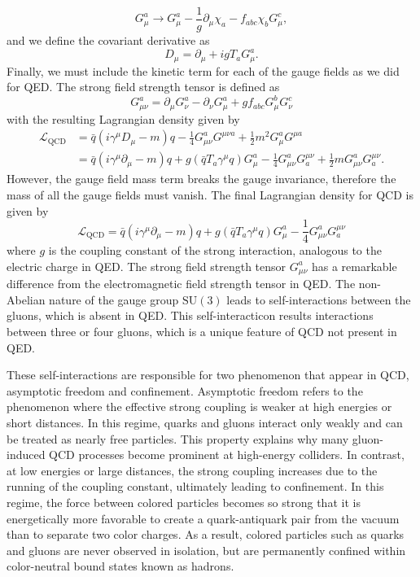 \begin{equation}
  G_{\mu}^{a} \to G_{\mu}^{a} - \frac{1}{g} \partial_{\mu}\chi_{a} - f_{abc}\chi_{b}G_{\mu}^{c},
\end{equation}
and we define the covariant derivative as
\begin{equation}
  D_{\mu} = \partial_{\mu} + ig T_{a}G_{\mu}^{a}.
  \label{eq:qcd_covariant_derivative}
\end{equation}
Finally, we must include the kinetic term for each of the gauge fields as we did for QED\@. The strong field strength tensor is defined as
\begin{equation}
  G_{\mu\nu}^{a} = \partial_{\mu}G_{\nu}^{a} - \partial_{\nu}G_{\mu}^{a} + g f_{abc}G_{\mu}^{b}G_{\nu}^{c}
  \label{eq:qcd_field_strength_tensor}
\end{equation}
with the resulting Lagrangian density given by
\begin{align}
  \mathcal{L}_{\mathrm{QCD}} &= \bar{q}(i\gamma^{\mu}D_{\mu} - m)q - \frac{1}{4}G_{\mu\nu}^{a}G^{\mu\nu a} + \frac{1}{2}m^2G_{\mu}^{a}G^{\mu a} \nonumber \nonumber \\
  &= \bar{q}(i\gamma^{\mu}\partial_{\mu} - m)q + g(\bar{q}T_{a}\gamma^{\mu}q)G_{\mu}^{a} - \frac{1}{4}G_{\mu\nu}^{a}G_{a}^{\mu\nu} + \frac{1}{2}mG_{\mu\nu}^{a}G_{a}^{\mu\nu}.
  \label{eq:qcd_lagrangian}
\end{align}
However, the gauge field mass term breaks the gauge invariance, therefore the mass of all the gauge fields must vanish. The final Lagrangian density for QCD is given by
\begin{equation}
  \mathcal{L}_{\mathrm{QCD}} = \bar{q}(i\gamma^{\mu}\partial_{\mu} - m)q + g(\bar{q}T_{a}\gamma^{\mu}q)G_{\mu}^{a} - \frac{1}{4}G_{\mu\nu}^{a}G_{a}^{\mu\nu}
  \label{eq:qcd_lagrangian_final}
\end{equation}
where $g$ is the coupling constant of the strong interaction, analogous to the electric charge in QED\@. The strong field strength tensor $G_{\mu\nu}^{a}$ has a remarkable difference from the electromagnetic field strength tensor in QED\@. The non-Abelian nature of the gauge group $\mathrm{SU}(3)$ leads to self-interactions between the gluons, which is absent in QED\@. This self-interacticon results interactions between three or four gluons, which is a unique feature of QCD not present in QED\@.

These self-interactions are responsible for two phenomenon that appear in QCD, asymptotic freedom and confinement. Asymptotic freedom refers to the phenomenon where the effective strong coupling is weaker at high energies or short distances. In this regime, quarks and gluons interact only weakly and can be treated as nearly free particles. This property explains why many gluon-induced QCD processes become prominent at high-energy colliders. In contrast, at low energies or large distances, the strong coupling increases due to the running of the coupling constant, ultimately leading to confinement. In this regime, the force between colored particles becomes so strong that it is energetically more favorable to create a quark-antiquark pair from the vacuum than to separate two color charges. As a result, colored particles such as quarks and gluons are never observed in isolation, but are permanently confined within color-neutral bound states known as hadrons.
